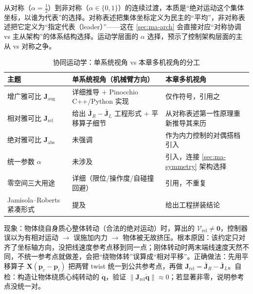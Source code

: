 \begin{insight}
从对称（$\alpha=\tfrac12$）到非对称（$\alpha\in\{0,1\}$）的连续过渡，本质是“绝对运动这个集体坐标，以谁为代表”的选择。对称表述把集体坐标定义为民主的“平均”，非对称表述把它定义为“指定代表（leader）”——这在 \cref{sec:ma-arch} 会直接对应“对称协调 vs 主从架构”的体系结构选择。运动学层面的 $\alpha$ 选择，预示了控制架构层面的主从 vs 对称之争。
\end{insight}

\begin{table}[H]\centering\small
\caption{协同运动学：单系统视角 vs 本章多机视角的分工}
\label{tab:ma-kin-division}
\begin{tabular}{p{3.0cm}p{5.4cm}p{5.0cm}}
\toprule
主题 & 单系统视角（机械臂方向） & 本章多机视角 \\
\midrule
增广雅可比 $\mathbf{J}_{\text{aug}}$ & 详细推导 $+$ Pinocchio C++/Python 实现 & 仅作符号，引用之 \\
相对雅可比 $\mathbf{J}_{\text{rel}}$ & 给出 $\bar{\mathbf{J}}_R-\bar{\mathbf{J}}_L$ 工程形式 $+$ 平移算子细节 & 从对称表述第一性原理重新推导其来历 \\
绝对雅可比 $\mathbf{J}_{\text{abs}}$ & 未强调 & 作为内力控制的对偶搭档引入 \\
统一参数 $\alpha$ & 未涉及 & 引入，连接 \cref{sec:ma-symmetry} 架构选择 \\
零空间三大用途 & 详细（限位/操作度/自碰撞回避） & 引用，不重复 \\
Jamisola--Roberts 紧凑形式 & 提及 & 给出工程拼装结论 \\
\bottomrule
\end{tabular}
\end{table}

\begin{pitfall}
现象：物体绕自身质心整体转动（合法的绝对运动）时，算出的 $\boldsymbol{\mathcal{V}}_{\text{rel}}\neq\mathbf{0}$，控制器误以为有相对运动 $\to$ 误施加内力 $\to$ 物体被无故挤压。根本原因：该约定只对齐了坐标轴方向，没把线速度参考点移到同一点；刚体转动时两末端线速度天然不同，不统一参考点就做差，会把“绕物体转”误算成“相对平移”。正确做法：先用平移算子 $\mathbf{X}(\mathbf{p}_c-\mathbf{p}_i)$ 把两臂 twist 统一到公共参考点，再做 $\mathbf{J}_{\text{rel}}=\bar{\mathbf{J}}_R-\bar{\mathbf{J}}_L$。自检：构造让物体绕质心纯转动的 $\dot{\mathbf{q}}$，验证 $\|\mathbf{J}_{\text{rel}}\dot{\mathbf{q}}\|\approx0$；若显著非零，说明参考点没统一对。
\end{pitfall}

